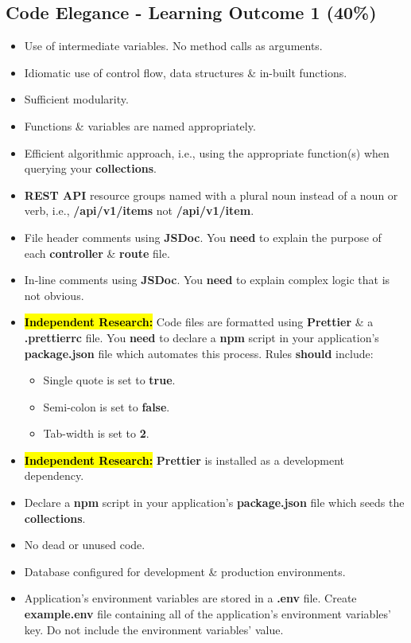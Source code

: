\documentclass{article}
\begin{document}
\subsection*{Code Elegance - Learning Outcome 1 (40\%)}
\begin{itemize}
	\item Use of intermediate variables. No method calls as arguments.
	\item Idiomatic use of control flow, data structures \& in-built functions.
	\item Sufficient modularity.
	\item Functions \& variables are named appropriately.
	\item Efficient algorithmic approach, i.e., using the appropriate function(s) when querying your \textbf{collections}.
	\item \textbf{REST API} resource groups named with a plural noun instead of a noun or verb, i.e., \textbf{/api/v1/items} not \textbf{/api/v1/item}.
	\item File header comments using \textbf{JSDoc}. You \textbf{need} to explain the purpose of each \textbf{controller} \& \textbf{route} file.
	\item In-line comments using \textbf{JSDoc}. You \textbf{need} to explain complex logic that is not obvious.
	\item \hl{\textbf{Independent Research:}} Code files are formatted using \textbf{Prettier} \& a \textbf{.prettierrc} file. You \textbf{need} to declare a \textbf{npm} script in your application's \textbf{package.json} file which automates this process. Rules \textbf{should} include:
	      \begin{itemize}
		      \item Single quote is set to \textbf{true}.
		      \item Semi-colon is set to \textbf{false}.
		      \item Tab-width is set to \textbf{2}.
	      \end{itemize}
	\item \hl{\textbf{Independent Research:}} \textbf{Prettier} is installed as a development dependency.
	\item Declare a \textbf{npm} script in your application's \textbf{package.json} file which seeds the \textbf{collections}.
	\item No dead or unused code.
	\item Database configured for development \& production environments.
	\item Application's environment variables are stored in a \textbf{.env} file. Create \textbf{example.env} file containing all of the application's environment variables' key. Do not include the environment variables' value.    
\end{itemize}
\end{document}
